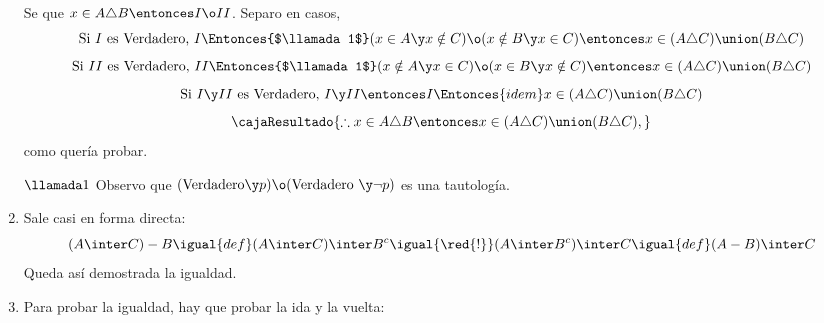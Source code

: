 \begin{enumerate}[label=\roman*)]
        Se que $x \in A \triangle B \entonces I \o II$. Separo en casos,
        $$
          \text{Si }I\text{ es Verdadero, }I \Entonces{$\llamada1$} (x \in A \y x \notin C) \o (x \notin B \y x \in C) \entonces x \in (A \triangle C) \union (B \triangle C)   \\
        $$
        $$
          \text{Si }II\text{ es Verdadero, }II \Entonces{$\llamada1$} (x \notin A \y x \in C) \o (x \in B \y x \notin C) \entonces x \in (A \triangle C) \union (B \triangle C) \\
        $$
        $$
          \text{Si }I \y II\text{ es Verdadero, }I \y II \entonces I
          \Entonces{idem}
          x \in (A \triangle C) \union (B \triangle C)
        $$
        $$
          \cajaResultado{
            \therefore x \in A \triangle B \entonces x \in (A \triangle C) \union (B \triangle C),
          }
        $$
        como quería probar.

        $\llamada1$ Observo que $(\text{Verdadero} \y p) \o (\text{Verdadero } \y \neg p)$ es una tautología.

  \item Sale casi en forma directa:
        $$
          (A \inter C) - B
          \igual{def}
          (A \inter C) \inter B^c
          \igual{\red{!}}
          (A \inter B^c) \inter C
          \igual{def}
          (A - B) \inter C
        $$
        Queda así demostrada la igualdad.

  \item Para probar la igualdad, hay que probar la ida y la vuelta:
\end{enumerate}

